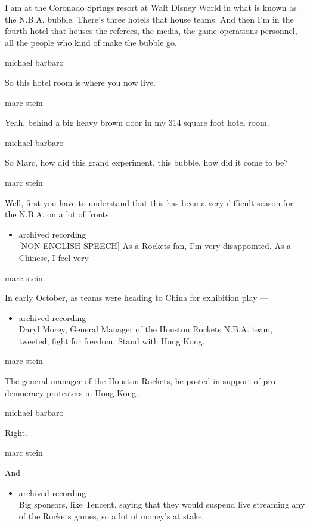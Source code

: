 I am at the Coronado Springs resort at Walt Disney World in what is
known as the N.B.A. bubble. There's three hotels that house teams. And
then I'm in the fourth hotel that houses the referees, the media, the
game operations personnel, all the people who kind of make the bubble
go.

michael barbaro

So this hotel room is where you now live.

marc stein

Yeah, behind a big heavy brown door in my 314 square foot hotel room.

michael barbaro

So Marc, how did this grand experiment, this bubble, how did it come to
be?

marc stein

Well, first you have to understand that this has been a very difficult
season for the N.B.A. on a lot of fronts.

\begin{itemize}
\tightlist
\item
  archived recording\\
  {[}NON-ENGLISH SPEECH{]} As a Rockets fan, I'm very disappointed. As a
  Chinese, I feel very ---
\end{itemize}

marc stein

In early October, as teams were heading to China for exhibition play ---

\begin{itemize}
\tightlist
\item
  archived recording\\
  Daryl Morey, General Manager of the Houston Rockets N.B.A. team,
  tweeted, fight for freedom. Stand with Hong Kong.
\end{itemize}

marc stein

The general manager of the Houston Rockets, he posted in support of
pro-democracy protesters in Hong Kong.

michael barbaro

Right.

marc stein

And ---

\begin{itemize}
\tightlist
\item
  archived recording\\
  Big sponsors, like Tencent, saying that they would suspend live
  streaming any of the Rockets games, so a lot of money's at stake.
\end{itemize}


